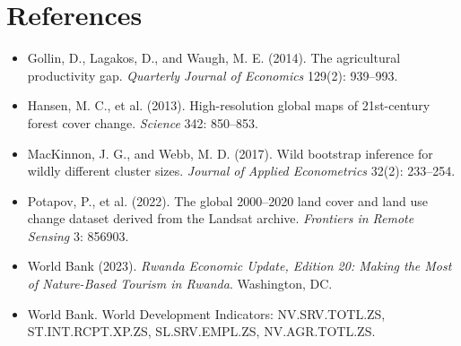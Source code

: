 \documentclass[11pt]{article}
\begin{document}
\section*{References}
\small
\begin{itemize}[leftmargin=*,label={}]
\item Gollin, D., Lagakos, D., and Waugh, M. E. (2014). The agricultural productivity gap. \textit{Quarterly Journal of Economics} 129(2): 939--993.
\item Hansen, M. C., et al. (2013). High-resolution global maps of 21st-century forest cover change. \textit{Science} 342: 850--853.
\item MacKinnon, J. G., and Webb, M. D. (2017). Wild bootstrap inference for wildly different cluster sizes. \textit{Journal of Applied Econometrics} 32(2): 233--254.
\item Potapov, P., et al. (2022). The global 2000--2020 land cover and land use change dataset derived from the Landsat archive. \textit{Frontiers in Remote Sensing} 3: 856903.
\item World Bank (2023). \textit{Rwanda Economic Update, Edition 20: Making the Most of Nature-Based Tourism in Rwanda}. Washington, DC.
\item World Bank. World Development Indicators: NV.SRV.TOTL.ZS, ST.INT.RCPT.XP.ZS, SL.SRV.EMPL.ZS, NV.AGR.TOTL.ZS.
\end{itemize}
\end{document}
